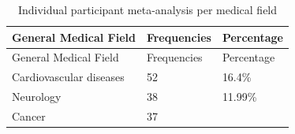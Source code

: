 \documentclass[]{article}
\begin{document}
\begin{longtable}[]{@{}lll@{}}
\caption{Individual participant meta-analysis per medical
field}\tabularnewline
\toprule
\begin{minipage}[b]{0.34\columnwidth}\raggedright
General Medical Field\strut
\end{minipage} & \begin{minipage}[b]{0.18\columnwidth}\raggedright
Frequencies\strut
\end{minipage} & \begin{minipage}[b]{0.18\columnwidth}\raggedright
Percentage\strut
\end{minipage}\tabularnewline
\midrule
\endfirsthead
\toprule
\begin{minipage}[b]{0.34\columnwidth}\raggedright
General Medical Field\strut
\end{minipage} & \begin{minipage}[b]{0.18\columnwidth}\raggedright
Frequencies\strut
\end{minipage} & \begin{minipage}[b]{0.18\columnwidth}\raggedright
Percentage\strut
\end{minipage}\tabularnewline
\midrule
\endhead
\begin{minipage}[t]{0.34\columnwidth}\raggedright
Cardiovascular diseases\strut
\end{minipage} & \begin{minipage}[t]{0.18\columnwidth}\raggedright
52\strut
\end{minipage} & \begin{minipage}[t]{0.18\columnwidth}\raggedright
16.4\%\strut
\end{minipage}\tabularnewline
\begin{minipage}[t]{0.34\columnwidth}\raggedright
Neurology\strut
\end{minipage} & \begin{minipage}[t]{0.18\columnwidth}\raggedright
38\strut
\end{minipage} & \begin{minipage}[t]{0.18\columnwidth}\raggedright
11.99\%\strut
\end{minipage}\tabularnewline
\begin{minipage}[t]{0.34\columnwidth}\raggedright
Cancer\strut
\end{minipage} & \begin{minipage}[t]{0.18\columnwidth}\raggedright
37\strut
\end{minipage} & \begin{minipage}[t]{0.18\columnwidth}\raggedright

\end{minipage}
\end{longtable}
\end{document}
